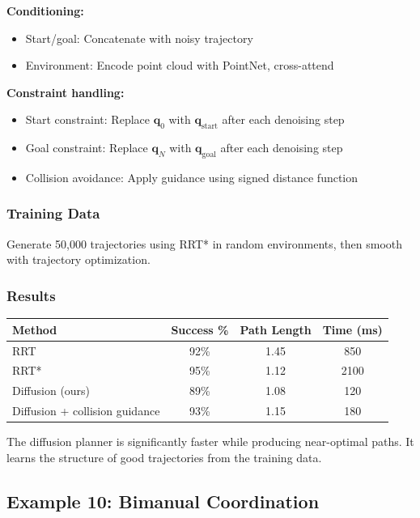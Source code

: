 \textbf{Conditioning:}
\begin{itemize}
    \item Start/goal: Concatenate with noisy trajectory
    \item Environment: Encode point cloud with PointNet, cross-attend
\end{itemize}

\textbf{Constraint handling:}
\begin{itemize}
    \item Start constraint: Replace $\mathbf{q}_0$ with $\mathbf{q}_{\text{start}}$ after each denoising step
    \item Goal constraint: Replace $\mathbf{q}_N$ with $\mathbf{q}_{\text{goal}}$ after each denoising step
    \item Collision avoidance: Apply guidance using signed distance function
\end{itemize}

\subsubsection{Training Data}

Generate 50,000 trajectories using RRT* in random environments, then smooth with trajectory optimization.

\subsubsection{Results}

\begin{center}
\begin{tabular}{lccc}
\toprule
\textbf{Method} & \textbf{Success \%} & \textbf{Path Length} & \textbf{Time (ms)} \\
\midrule
RRT & 92\% & 1.45 & 850 \\
RRT* & 95\% & 1.12 & 2100 \\
Diffusion (ours) & 89\% & 1.08 & 120 \\
Diffusion + collision guidance & 93\% & 1.15 & 180 \\
\bottomrule
\end{tabular}
\end{center}

The diffusion planner is significantly faster while producing near-optimal paths. It learns the structure of good trajectories from the training data.

\subsection{Example 10: Bimanual Coordination}
\label{subsec:example_bimanual}

